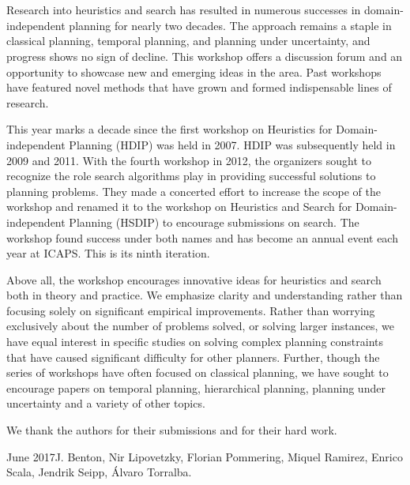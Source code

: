 \section*{}


Research into heuristics and search has resulted in numerous successes in domain-independent planning for nearly two decades. The approach remains a staple in classical planning, temporal planning, and planning under uncertainty, and progress shows no sign of decline. This workshop offers a discussion forum and an opportunity to showcase new and emerging ideas in the area. Past workshops have featured novel methods that have grown and formed indispensable lines of research.

This year marks a decade since the first workshop on Heuristics for Domain-independent Planning (HDIP) was held in 2007. HDIP was subsequently held in 2009 and 2011. With the fourth workshop in 2012, the organizers sought to recognize the role search algorithms play in providing successful solutions to planning problems. They made a concerted effort to increase the scope of the workshop and renamed it to the workshop on Heuristics and Search for Domain-independent Planning (HSDIP) to encourage submissions on search. The workshop found success under both names and has become an annual event each year at ICAPS. This is its ninth iteration.

Above all, the workshop encourages innovative ideas for heuristics and search both in theory and practice. We emphasize clarity and understanding rather than focusing solely on significant empirical improvements. Rather than worrying exclusively about the number of problems solved, or solving larger instances, we have equal interest in specific studies on solving complex planning constraints that have caused significant difficulty for other planners. Further, though the series of workshops have often focused on classical planning, we have sought to encourage papers on temporal planning, hierarchical planning, planning under uncertainty and a variety of other topics.

\bigskip
\noindent
We thank the authors for their submissions and for their hard work.

\vspace{0.5cm}
\begin{flushright}\noindent
  June 2017\hfill J. Benton, Nir Lipovetzky, Florian Pommering, Miquel Ramirez, Enrico Scala, Jendrik Seipp, {\'A}lvaro Torralba.
\end{flushright}
